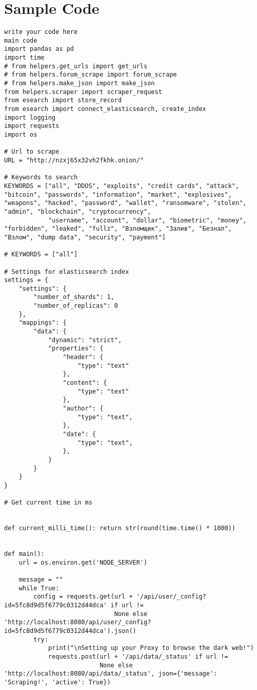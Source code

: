 \documentclass[10pt]{report}
\begin{document}
\section{Sample Code}
\begin{lstlisting}
write your code here
main code
import pandas as pd
import time
# from helpers.get_urls import get_urls
# from helpers.forum_scrape import forum_scrape
# from helpers.make_json import make_json
from helpers.scraper import scraper_request
from esearch import store_record
from esearch import connect_elasticsearch, create_index
import logging
import requests
import os

# Url to scrape
URL = "http://nzxj65x32vh2fkhk.onion/"

# Keywords to search
KEYWORDS = ["all", "DDOS", "exploits", "credit cards", "attack", "bitcoin", "passwords", "information", "market", "explosives", "weapons", "hacked", "password", "wallet", "ransomware", "stolen", "admin", "blockchain", "cryptocurrency",
            "username", "account", "dollar", "biometric", "money", "forbidden", "leaked", "fullz", "Взломщик", "Залив", "Безнал", "Взлом", "dump data", "security", "payment"]

# KEYWORDS = ["all"]

# Settings for elasticsearch index
settings = {
    "settings": {
        "number_of_shards": 1,
        "number_of_replicas": 0
    },
    "mappings": {
        "data": {
            "dynamic": "strict",
            "properties": {
                "header": {
                    "type": "text"
                },
                "content": {
                    "type": "text"
                },
                "author": {
                    "type": "text",
                },
                "date": {
                    "type": "text",
                },
            }
        }
    }
}

# Get current time in ms


def current_milli_time(): return str(round(time.time() * 1000))


def main():
    url = os.environ.get('NODE_SERVER')

    message = ""
    while True:
        config = requests.get(url + '/api/user/_config?id=5fc8d9d5f6779c0312d44dca' if url !=
                              None else 'http://localhost:8080/api/user/_config?id=5fc8d9d5f6779c0312d44dca').json()
        try:
            print("\nSetting up your Proxy to browse the dark web!")
            requests.post(url + '/api/data/_status' if url !=
                          None else 'http://localhost:8080/api/data/_status', json={'message': 'Scraping!', 'active': True})


\end{lstlisting}
\end{document}

